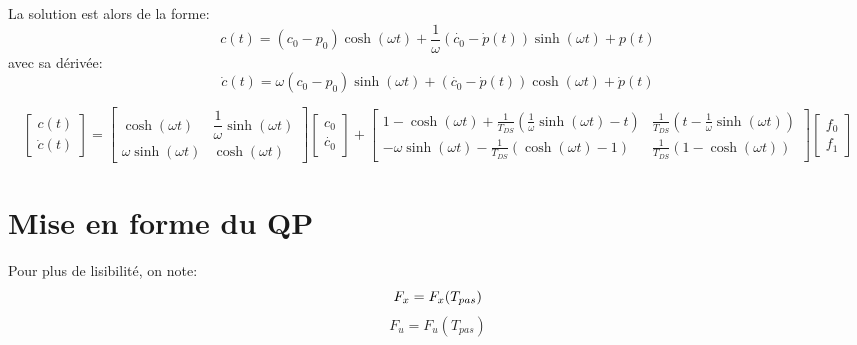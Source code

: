 \documentclass[10pt,a4paper]{article}
\begin{document}
La solution est alors de la forme:
\begin{equation}
c(t)=(c_0-p_0)\cosh(\omega t)+\dfrac{1}{\omega}(\dot{c_0}-\dot{p}(t))\sinh(\omega t)+p(t)
\end{equation}
avec sa dérivée:
\begin{equation}
\dot{c}(t)=\omega(c_0-p_0)\sinh(\omega t)+(\dot{c_0}-\dot{p}(t))\cosh(\omega t)+\dot{p}(t)
\end{equation}



\begin{equation}
\begin{bmatrix} 
c(t) \\
\dot{c}(t) 
\end{bmatrix} 
= 
\begin{bmatrix} 
\cosh(\omega t) 		&	 \dfrac{1}{\omega}\sinh(\omega t) \\
\omega\sinh(\omega t)	&	 \cosh(\omega t)
\end{bmatrix}
\begin{bmatrix} 
c_0 \\
\dot{c_0}
\end{bmatrix} 
+
\begin{bmatrix} 
1-\cosh(\omega t)+ \frac{1}{T_{DS}}(\frac{1}{\omega}\sinh(\omega t)-t)	& \frac{1}{T_{DS}}(t-\frac{1}{\omega}\sinh(\omega t)) \\
-\omega\sinh(\omega t)-	\frac{1}{T_{DS}}(\cosh(\omega t)-1) & 	\frac{1}{T_{DS}}(1-\cosh(\omega t))
\end{bmatrix}
\begin{bmatrix} 
f_0 \\
f_1
\end{bmatrix}
\end{equation}
\section{Mise en forme du QP}
Pour plus de lisibilité, on note:
\begin{equation}
F_x=F_x(T_{pas})  \linebreak
\end{equation} 
\begin{equation}
F_u=F_u(T_{pas})
\end{equation} 
\end{document}
